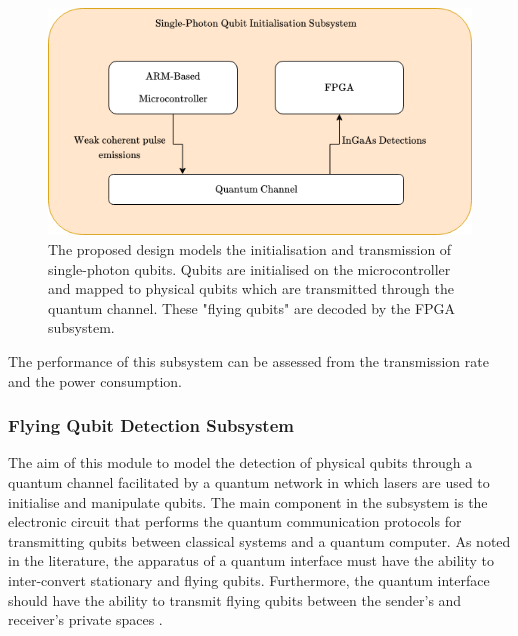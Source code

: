 \begin{figure}[!ht]
	\centering
	\includegraphics[width=\linewidth]{body/ch4/figs/spqis-overview}
	\caption[Single-Photon Qubit Initialisation Subsystem (SPQIS) Overview.]{The proposed design models the initialisation and transmission of single-photon qubits. Qubits are initialised on the microcontroller and mapped to physical qubits which are transmitted through the quantum channel. These "flying qubits" are decoded by the FPGA subsystem.}
	\label{fig:spqis-overview}
\end{figure}

The performance of this subsystem can be assessed from the  transmission rate and the power consumption. 

\subsubsection{Flying Qubit Detection Subsystem}

The aim of this module to model the detection of physical qubits through a quantum channel facilitated by a quantum network in which lasers are used to initialise and manipulate qubits. The main component in the subsystem is the electronic circuit that performs the quantum communication protocols for transmitting qubits between classical systems and a quantum computer. As noted in the literature, the apparatus of a quantum interface must have the ability to inter-convert stationary and flying qubits. Furthermore, the quantum interface should have the ability to transmit flying qubits between the sender's and receiver's private spaces \cite{divincenzo2000physical}. 

